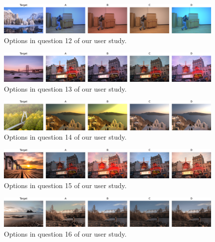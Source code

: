 \begin{figure}[ht]
    \centering
    \includegraphics[width=1\linewidth]{figures/user_study/question_12.png}
    \caption{Options in question 12 of our user study.}
    \label{fig:appendix-user-study-q12}
\end{figure}



\begin{figure}[ht]
    \centering
    \includegraphics[width=1\linewidth]{figures/user_study/question_13.png}
    \caption{Options in question 13 of our user study.}
    \label{fig:appendix-user-study-q13}
\end{figure}



\begin{figure}[ht]
    \centering
    \includegraphics[width=1\linewidth]{figures/user_study/question_14.png}
    \caption{Options in question 14 of our user study.}
    \label{fig:appendix-user-study-q14}
\end{figure}



\begin{figure}[ht]
    \centering
    \includegraphics[width=1\linewidth]{figures/user_study/question_15.png}
    \caption{Options in question 15 of our user study.}
    \label{fig:appendix-user-study-q15}
\end{figure}



\begin{figure}[ht]
    \centering
    \includegraphics[width=1\linewidth]{figures/user_study/question_16.png}
    \caption{Options in question 16 of our user study.}
    \label{fig:appendix-user-study-q16}
\end{figure}



